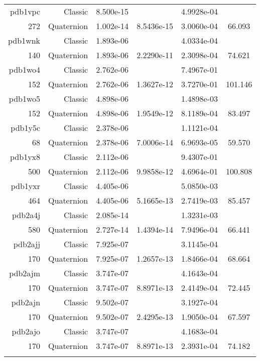 \begin{xltabular}{\textwidth}{r|rS[table-format=1.3e+2]S[table-format=1.4e+2]S[table-format=1.4e+2]S[table-format=-1.3]}
pdb1vpc & Classic & 8.500e-15 &  & 4.9928e-04 & \\
272 & Quaternion & 1.002e-14 & 8.5436e-15 & 3.0060e-04 & 66.093\\  \addlinespace
pdb1wnk & Classic & 1.893e-06 &  & 4.0334e-04 & \\
140 & Quaternion & 1.893e-06 & 2.2290e-11 & 2.3098e-04 & 74.621\\  \addlinespace
pdb1wo4 & Classic & 2.762e-06 &  & 7.4967e-01 & \\
152 & Quaternion & 2.762e-06 & 1.3627e-12 & 3.7270e-01 & 101.146\\  \addlinespace
pdb1wo5 & Classic & 4.898e-06 &  & 1.4898e-03 & \\
152 & Quaternion & 4.898e-06 & 1.9549e-12 & 8.1189e-04 & 83.497\\  \addlinespace
pdb1y5c & Classic & 2.378e-06 &  & 1.1121e-04 & \\
68 & Quaternion & 2.378e-06 & 7.0006e-14 & 6.9693e-05 & 59.570\\  \addlinespace
pdb1yx8 & Classic & 2.112e-06 &  & 9.4307e-01 & \\
500 & Quaternion & 2.112e-06 & 9.9858e-12 & 4.6964e-01 & 100.808\\  \addlinespace
pdb1yxr & Classic & 4.405e-06 &  & 5.0850e-03 & \\
464 & Quaternion & 4.405e-06 & 5.1665e-13 & 2.7419e-03 & 85.457\\  \addlinespace
pdb2a4j & Classic & 2.085e-14 &  & 1.3231e-03 & \\
580 & Quaternion & 2.727e-14 & 1.4394e-14 & 7.9496e-04 & 66.441\\  \addlinespace
pdb2ajj & Classic & 7.925e-07 &  & 3.1145e-04 & \\
170 & Quaternion & 7.925e-07 & 1.2657e-13 & 1.8466e-04 & 68.664\\  \addlinespace
pdb2ajm & Classic & 3.747e-07 &  & 4.1643e-04 & \\
170 & Quaternion & 3.747e-07 & 8.8971e-13 & 2.4149e-04 & 72.445\\  \addlinespace
pdb2ajn & Classic & 9.502e-07 &  & 3.1927e-04 & \\
170 & Quaternion & 9.502e-07 & 2.4295e-13 & 1.9050e-04 & 67.597\\  \addlinespace
pdb2ajo & Classic & 3.747e-07 &  & 4.1683e-04 & \\
170 & Quaternion & 3.747e-07 & 8.8971e-13 & 2.3931e-04 & 74.182\\  \addlinespace

\end{xltabular}
